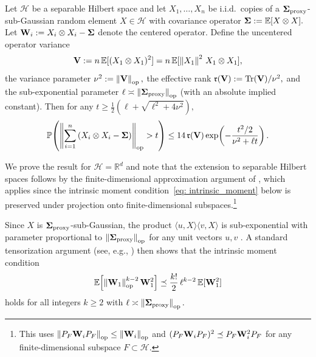 \documentclass[mnsc]{informs3aa} %
\newcommand{\R}{\mathbb{R}}
\DeclareMathOperator{\Tr}{Tr}
\newcommand{\norm}[1]{\left\|#1\right\|}
\newcommand{\bSigma}{\bold{\Sigma}}
\def\sr{\mathfrak{r}}
\newcommand{\op}{\mathrm{op}}
\newcommand{\mH}{\mathcal H}
\begin{document}
\begin{lemma}\label{lem: operator_bernstein}
Let $\mH$ be a separable Hilbert space and let $X_1,\ldots,X_n$ be i.i.d.\ copies of a $\bSigma_{\mathrm{proxy}}$-sub-Gaussian random element $X\in\mH$ with covariance operator $\bSigma:=\mathbb{E}[X\otimes X].$ Let $\bold{W}_i:=X_i\otimes X_i-\bSigma$ denote the centered operator. Define the uncentered operator variance
\[\bold{V}:=n\,\mathbb{E}[(X_1\otimes X_1)^2]=n\,\mathbb{E}[\norm{X_1}^2\,X_1\otimes X_1],\]
the variance parameter $\nu^2:=\norm{\bold{V}}_{\op},$ the effective rank $\sr(\bold{V}):=\Tr(\bold{V})/\nu^2,$ and the sub-exponential parameter $\ell\asymp\norm{\bSigma_{\mathrm{proxy}}}_{\op}$ (with an absolute implied constant). Then for any $t\geq\frac{1}{2}\!\left(\ell+\sqrt{\ell^2+4\nu^2}\right),$
\begin{equation}\label{eq: operator_bernstein}
\mathbb{P}\!\left(\left\|\sum_{i=1}^n\left(X_i\otimes X_i-\bSigma\right)\right\|_{\op}>t\right)\leq 14\,\sr(\bold{V})\exp\!\left(-\frac{t^2/2}{\nu^2+\ell t}\right).
\end{equation}
\end{lemma}
We prove the result for $\mH=\R^d$ and note that the extension to separable Hilbert spaces follows by the finite-dimensional approximation argument of \citet[Section~3.2]{minsker2017}, which applies since the intrinsic moment condition~\eqref{eq: intrinsic_moment} below is preserved under projection onto finite-dimensional subspaces.\footnote{This uses $\norm{P_F \bold{W}_i P_F}_{\op}\leq\norm{\bold{W}_i}_{\op}$ and $(P_F \bold{W}_i P_F)^2\preceq P_F \bold{W}_i^2 P_F$ for any finite-dimensional subspace $F\subset\mH.$}

Since $X$ is $\bSigma_{\mathrm{proxy}}$-sub-Gaussian, the product $\langle u,X\rangle\langle v,X\rangle$ is sub-exponential with parameter proportional to $\norm{\bSigma_{\mathrm{proxy}}}_{\op}$ for any unit vectors $u,v$ \citep[Lemma~2.7.7]{vershynin2018high}. A standard tensorization argument (see, e.g., \citet[Proposition~2.1]{koltchinskii2017}) then shows that the intrinsic moment condition
\begin{equation}\label{eq: intrinsic_moment}
\mathbb{E}\!\left[\norm{\bold{W}_1}_{\op}^{k-2}\bold{W}_1^2\right]\preceq\frac{k!}{2}\,\ell^{k-2}\,\mathbb{E}[\bold{W}_1^2]
\end{equation}
holds for all integers $k\geq 2$ with $\ell\asymp\norm{\bSigma_{\mathrm{proxy}}}_{\op}.$
\end{document}
